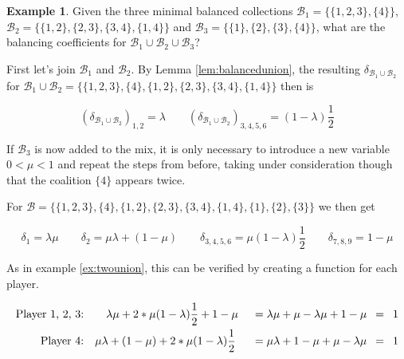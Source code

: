 \documentclass[10pt,a4paper,titlepage]{article}
\theoremstyle{plain}
\theoremstyle{definition}
\newtheorem{example}[thm]{Example} %
\begin{document}
\begin{example}
    Given the three minimal balanced collections $\mathcal{B}_1 = \{\{1, 2, 3\}, \{4\}\}$, $\mathcal{B}_2 = \{\{1, 2\}, \{2, 3\}, \{3, 4\}, \{1, 4\}\}$ and $\mathcal{B}_3 = \{\{1\}, \{2\}, \{3\}, \{4\}\}$, what are the balancing coefficients for $\mathcal{B}_1 \cup \mathcal{B}_2 \cup \mathcal{B}_3$?

    First let's join $\mathcal{B}_1$ and $\mathcal{B}_2$. By Lemma \ref{lem:balancedunion}, the resulting $\delta_{\mathcal{B}_1\cup\mathcal{B}_2}$ for $\mathcal{B}_1\cup\mathcal{B}_2 = \{\{1, 2, 3\}, \{4\}, \{1, 2\}, \{2, 3\}, \{3, 4\}, \{1, 4\}\}$ then is

    \begin{equation*}
        (\delta_{\mathcal{B}_1\cup\mathcal{B}_2})_{1, 2} = \lambda\qquad (\delta_{\mathcal{B}_1\cup\mathcal{B}_2})_{3, 4, 5, 6} = (1 - \lambda)\frac{1}{2}
    \end{equation*}

    If $\mathcal{B}_3$ is now added to the mix, it is only necessary to introduce a new variable $0 < \mu < 1$ and repeat the steps from before, taking under consideration though that the coalition $\{4\}$ appears twice.

    For $\mathcal{B} = \{\{1, 2, 3\}, \{4\}, \{1, 2\}, \{2, 3\}, \{3, 4\}, \{1, 4\}, \{1\}, \{2\}, \{3\}\}$ we then get\vspace{-10pt}

    \begin{equation*}
        \delta_1 = \lambda \mu\qquad \delta_2 = \mu \lambda + (1 - \mu)\qquad \delta_{3, 4, 5, 6} = \mu(1 - \lambda)\frac{1}{2}\qquad \delta_{7, 8, 9} = 1 - \mu
    \end{equation*}

    As in example \ref{ex:twounion}, this can be verified by creating a function for each player.\vspace{-10pt}

    \begin{alignat*}{3}
        \text{Player 1, 2, 3:} & \qquad \lambda\mu + 2 * \mu(1-\lambda)\frac{1}{2} + 1 - \mu &\enskip=\lambda\mu + \mu - \lambda\mu + 1 - \mu &\enskip=\enskip 1\\
        \text{Player 4:} & \quad \mu \lambda + (1 - \mu) + 2 * \mu(1-\lambda)\frac{1}{2} &\enskip= \mu\lambda + 1 - \mu + \mu - \lambda \mu &\enskip=\enskip 1
    \end{alignat*}%
\end{example}
\end{document}
